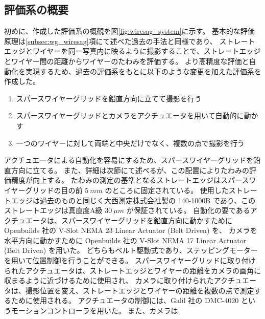 \documentclass[../../main.tex]{subfiles}
\begin{document}
\subsection{評価系の概要}
初めに、作成した評価系の概観を図\ref{fig:wiresag_system}に示す。
基本的な評価原理は\ref{subsec:wg_wiresag}項にて述べた過去の手法と同様であり、
ストレートエッジとワイヤーを同一写真内に映るように撮影することで、ストレートエッジとワイヤー間の距離からワイヤーのたわみを評価する。
より高精度な評価と自動化を実現するため、過去の評価系をもとに以下のような変更を加えた評価系を作成した。
\begin{enumerate}
    \item スパースワイヤーグリッドを鉛直方向に立てて撮影を行う
    \item スパースワイヤーグリッドとカメラをアクチュエータを用いて自動的に動かす
    \item 一つのワイヤーに対して両端と中央だけでなく、複数の点で撮影を行う
\end{enumerate}

アクチュエータによる自動化を容易にするため、スパースワイヤーグリッドを鉛直方向に立てる。
また、詳細は次節にて述べるが、この配置によりたわみの評価精度が向上する。
たわみの測定の基準となるストレートエッジはスパースワイヤーグリッドの目の前 $\SI{5}{mm}$ のところに固定されている。
使用したストレートエッジは過去のものと同じく大西測定株式会社製の 140-1000B であり、このストレートエッジは真直度A級 $\SI{30}{\mu m}$ が保証されている。
自動化の要であるアクチュエータは、スパースワイヤーグリッドを鉛直方向に動かすために Openbuilds 社の V-Slot NEMA 23 Linear Actuator (Belt Driven) を、
カメラを水平方向に動かすために Openbuilds 社の V-Slot NEMA 17 Linear Actuator (Belt Driven) を用いた。
どちらもベルト駆動式であり、ステッピングモーターを用いて位置制御を行うことができる。
スパースワイヤーグリッドに取り付けられたアクチュエータは、ストレートエッジとワイヤーの距離をカメラの画角に収まるように近づけるために使用され、
カメラに取り付けられたアクチュエータは、撮影位置を変え、ストレートエッジとワイヤーの距離を複数の点で測定するために使用される。
アクチュエータの制御には、Galil 社の DMC-4020 というモーションコントローラを用いた。
また、カメラは
\end{document}
